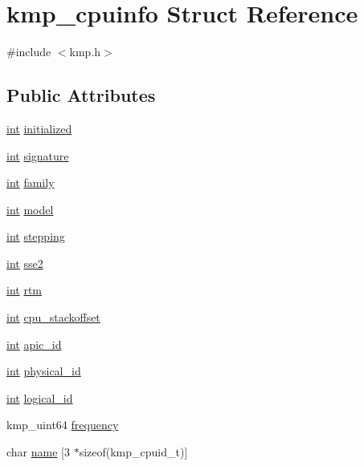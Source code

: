 \hypertarget{structkmp__cpuinfo}{\section{kmp\-\_\-cpuinfo Struct Reference}
\label{structkmp__cpuinfo}
}


{\ttfamily \#include $<$kmp.\-h$>$}

\subsection*{Public Attributes}
\begin{DoxyCompactItemize}
\item 
\hyperlink{ittnotify__static_8h_a8b8dcd723308a8cb5d84277c7a3fff70}{int} \hyperlink{structkmp__cpuinfo_a340553795a3c12f5f72d3333027dc1ef}{initialized}
\item 
\hyperlink{ittnotify__static_8h_a8b8dcd723308a8cb5d84277c7a3fff70}{int} \hyperlink{structkmp__cpuinfo_a8aac4a116cdfd108b60d8fc8a3cda7c1}{signature}
\item 
\hyperlink{ittnotify__static_8h_a8b8dcd723308a8cb5d84277c7a3fff70}{int} \hyperlink{structkmp__cpuinfo_a0ef7a4d4fcf0f147c6049310bed9d966}{family}
\item 
\hyperlink{ittnotify__static_8h_a8b8dcd723308a8cb5d84277c7a3fff70}{int} \hyperlink{structkmp__cpuinfo_afbf2c46e7d9c4e8f38e78be63e12f34c}{model}
\item 
\hyperlink{ittnotify__static_8h_a8b8dcd723308a8cb5d84277c7a3fff70}{int} \hyperlink{structkmp__cpuinfo_af2dd9e7cd2b55c588f9f7bc8d152dd41}{stepping}
\item 
\hyperlink{ittnotify__static_8h_a8b8dcd723308a8cb5d84277c7a3fff70}{int} \hyperlink{structkmp__cpuinfo_a06952924c8236563056c13d3158c70dc}{sse2}
\item 
\hyperlink{ittnotify__static_8h_a8b8dcd723308a8cb5d84277c7a3fff70}{int} \hyperlink{structkmp__cpuinfo_a86197ba559ddb32df419fe8589b25200}{rtm}
\item 
\hyperlink{ittnotify__static_8h_a8b8dcd723308a8cb5d84277c7a3fff70}{int} \hyperlink{structkmp__cpuinfo_a261ccb280417486b1f9972e6c2d5d717}{cpu\-\_\-stackoffset}
\item 
\hyperlink{ittnotify__static_8h_a8b8dcd723308a8cb5d84277c7a3fff70}{int} \hyperlink{structkmp__cpuinfo_a0aca284c6e9b610e35c33c2ead7b6ce8}{apic\-\_\-id}
\item 
\hyperlink{ittnotify__static_8h_a8b8dcd723308a8cb5d84277c7a3fff70}{int} \hyperlink{structkmp__cpuinfo_a20bc3bb9a899855733dd05d7ba5f042c}{physical\-\_\-id}
\item 
\hyperlink{ittnotify__static_8h_a8b8dcd723308a8cb5d84277c7a3fff70}{int} \hyperlink{structkmp__cpuinfo_a321ce01f5bddf1ca648122ce827b5fb1}{logical\-\_\-id}
\item 
kmp\-\_\-uint64 \hyperlink{structkmp__cpuinfo_a8daaba40f317228e14dc2e37ad8b0170}{frequency}
\item 
char \hyperlink{structkmp__cpuinfo_a17f3ff5dbc72594ab37b92b7ee82b218}{name} \mbox{[}3 $\ast$sizeof(kmp\-\_\-cpuid\-\_\-t)\mbox{]}
\end{DoxyCompactItemize}


